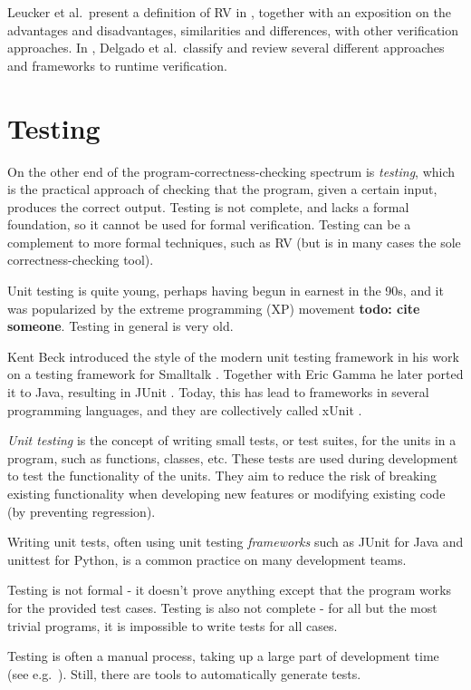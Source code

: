 \documentclass[a4paper,11pt]{kth-mag}
\newcommand{\todo}[1]{\textbf{todo: #1}}
\begin{document}
Leucker et al.\ present a definition of RV in \cite{leucker09abriefaccount},
together with an exposition on the advantages and disadvantages, similarities
and differences, with other verification approaches. In
\cite{delgado04taxonomy}, Delgado et al.\ classify and review several different
approaches and frameworks to runtime verification.


\section{Testing} \label{section-testing}
On the other end of the program-correctness-checking spectrum is
\emph{testing}, which is the practical approach of checking that the program,
given a certain input, produces the correct output.  Testing is not complete,
and lacks a formal foundation, so it cannot be used for formal verification.
Testing can be a complement to more formal techniques, such as RV (but is in
many cases the sole correctness-checking tool).

Unit testing is quite young, perhaps having begun in earnest in the 90s, and it
was popularized by the extreme programming (XP) movement \todo{cite someone}.
Testing in general is very old.

Kent Beck introduced the style of the modern unit testing framework in his work
on a testing framework  for Smalltalk \cite{becksmalltalktesting}.  Together
with Eric Gamma he later ported it to Java, resulting in JUnit \cite{junit}.
Today, this has lead to frameworks in several programming languages, and they
are collectively called xUnit \cite{fowlerxunit}.

\textit{Unit testing} is the concept of writing small tests, or test suites,
for the units in a program, such as functions, classes, etc. These tests are
used during development to test the functionality of the units. They aim to
reduce the risk of breaking existing functionality when developing new features
or modifying existing code (by preventing regression).

Writing unit tests, often using unit testing \textit{frameworks} such as JUnit
\cite{junit} for Java and unittest \cite{python-unittest} for Python, is a
common practice on many development teams.

Testing is not formal - it doesn't prove anything except that the program works
for the provided test cases. Testing is also not complete - for all but the
most trivial programs, it is impossible to write tests for all cases.

Testing is often a manual process, taking up a large part of development time
(see e.g.\ \cite{brooks75mythicalmanmonth}). Still, there are tools to automatically
generate tests.
\end{document}
